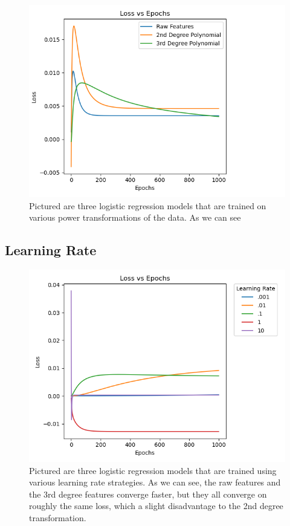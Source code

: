 \documentclass{article}
\begin{document}
\begin{figure}[h]{
    \centering
    \includegraphics[width=.8\textwidth]{loss_poly.png}
    \caption{Pictured are three logistic regression models that are trained on various power transformations of the data. As we can see}
    \label{fig:my_label}
    }
\end{figure}

\subsection{Learning Rate}

\begin{figure}[h]{
    \centering
    \includegraphics[width=.8\textwidth]{learning_rate.png}
    \caption{Pictured are three logistic regression models that are trained using various learning rate strategies. As we can see, the raw features and the 3rd degree features converge faster, but they all converge on roughly the same loss, which a slight disadvantage to the 2nd degree transformation.}
    \label{fig:my_label}
    }
\end{figure}
\end{document}

